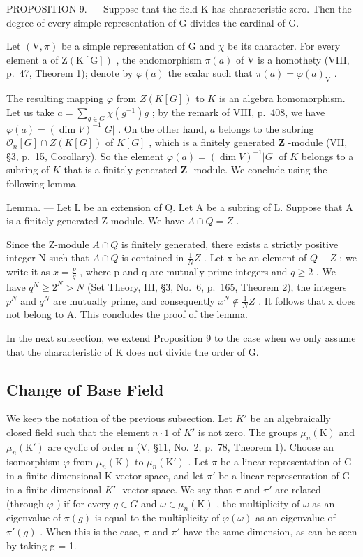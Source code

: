 PROPOSITION 9. --- Suppose that the field K has characteristic zero. Then the degree of every simple representation of G divides the cardinal of G.

Let \((\mathrm{V},\pi)\) be a simple representation of G and \(\chi\) be its character. For every element a of \(\mathrm{Z}(\mathrm{K}[\mathrm{G}])\) , the endomorphism \(\pi(a)\) of V is a homothety (VIII, p.~47, Theorem 1); denote by \(\varphi(a)\) the scalar such that \(\pi(a)=\varphi(a)_{\mathrm{V}}\) .

The resulting mapping \(\varphi\) from \(Z(K[G])\) to \(K\) is an algebra homomorphism. Let us take \(a = \sum_{g \in G} \chi(g^{-1})g\) ; by the remark of VIII, p.~408, we have \(\varphi(a) = (\dim V)^{-1}|G|\) . On the other hand, \(a\) belongs to the subring \(\mathcal{O}_n[G] \cap Z(K[G])\) of \(K[G]\) , which is a finitely generated \(\mathbf{Z}\) -module (VII, §3, p.~15, Corollary). So the element \(\varphi(a) = (\dim V)^{-1}|G|\) of \(K\) belongs to a subring of \(K\) that is a finitely generated \(\mathbf{Z}\) -module. We conclude using the following lemma.

Lemma. --- Let L be an extension of Q. Let A be a subring of L. Suppose that A is a finitely generated Z-module. We have \(A \cap Q = Z\) .

Since the Z-module \(A \cap Q\) is finitely generated, there exists a strictly positive integer N such that \(A \cap Q\) is contained in \(\frac{1}{N}Z\) . Let x be an element of \(Q - Z\) ; we write it as \(x = \frac{p}{q}\) , where p and q are mutually prime integers and \(q \geqslant 2\) . We have \(q^{N} \geqslant 2^{N} > N\) (Set Theory, III, §3, No.~6, p.~165, Theorem 2), the integers \(p^{N}\) and \(q^{N}\) are mutually prime, and consequently \(x^{N} \notin \frac{1}{N}Z\) . It follows that x does not belong to A. This concludes the proof of the lemma.

In the next subsection, we extend Proposition 9 to the case when we only assume that the characteristic of K does not divide the order of G.

\subsection{Change of Base Field}

We keep the notation of the previous subsection. Let \(K'\) be an algebraically closed field such that the element \(n \cdot 1\) of \(K'\) is not zero. The groups \(\mu_{n}(\mathrm{K})\) and \(\mu_{n}(\mathrm{K}')\) are cyclic of order n (V, §11, No.~2, p.~78, Theorem 1). Choose an isomorphism \(\varphi\) from \(\mu_{n}(\mathrm{K})\) to \(\mu_{n}(\mathrm{K}')\) . Let \(\pi\) be a linear representation of G in a finite-dimensional K-vector space, and let \(\pi'\) be a linear representation of G in a finite-dimensional \(K'\) -vector space. We say that \(\pi\) and \(\pi'\) are related (through \(\varphi\) ) if for every \(g \in G\) and \(\omega \in \mu_{n}(\mathrm{K})\) , the multiplicity of \(\omega\) as an eigenvalue of \(\pi(g)\) is equal to the multiplicity of \(\varphi(\omega)\) as an eigenvalue of \(\pi'(g)\) . When this is the case, \(\pi\) and \(\pi'\) have the same dimension, as can be seen by taking g = 1.


